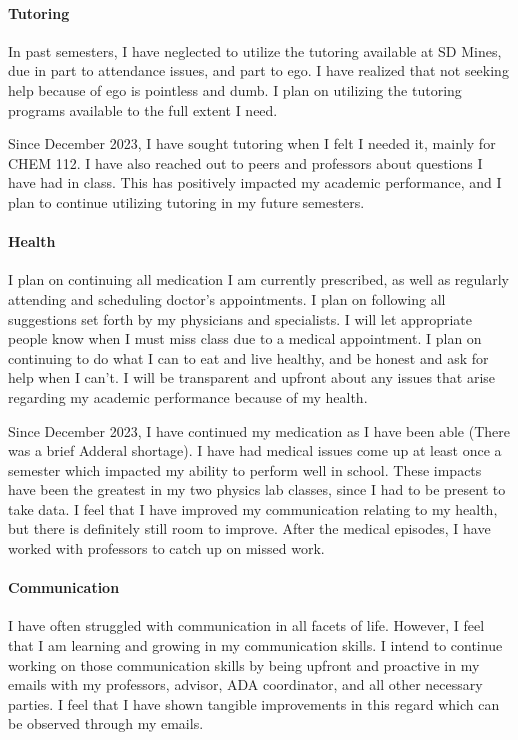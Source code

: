 \documentclass[12pt]{article}
\begin{document}
\paragraph{Tutoring}
In past semesters, I have neglected to utilize the tutoring available at SD Mines, 
due in part to attendance issues, and part to ego.
I have realized that not seeking help because of ego is pointless and dumb.
I plan on utilizing the tutoring programs available to the full extent I need.

Since December 2023, I have sought tutoring when I felt I needed it,
mainly for CHEM 112.
I have also reached out to peers and professors about questions I have had
in class.
This has positively impacted my academic performance, and I plan to 
continue utilizing tutoring in my future semesters.

\paragraph{Health}
I plan on continuing all medication I am currently prescribed, as well as 
regularly attending and scheduling doctor's appointments.
I plan on following all suggestions set forth by my physicians and specialists.
I will let appropriate people know when I must miss class due to a medical appointment.
I plan on continuing to do what I can to eat and live healthy, and be honest and 
ask for help when I can't.
I will be transparent and upfront about any issues that arise regarding my academic performance 
because of my health.

Since December 2023, I have continued my medication as I have been able 
(There was a brief Adderal shortage).
I have had medical issues come up at least once a semester which impacted my ability
to perform well in school.
These impacts have been the greatest in my two physics lab classes,
since I had to be present to take data.
I feel that I have improved my communication relating to my health,
but there is definitely still room to improve.
After the medical episodes, I have worked with professors to catch up on missed work.

\paragraph{Communication}
I have often struggled with communication in all facets of life. 
However, I feel that I am learning and growing in my communication skills.
I intend to continue working on those communication skills by being upfront and 
proactive in my emails with my professors, advisor, ADA coordinator, and all other 
necessary parties.
I feel that I have shown tangible improvements in this regard which can be observed
through my emails.
\end{document}
